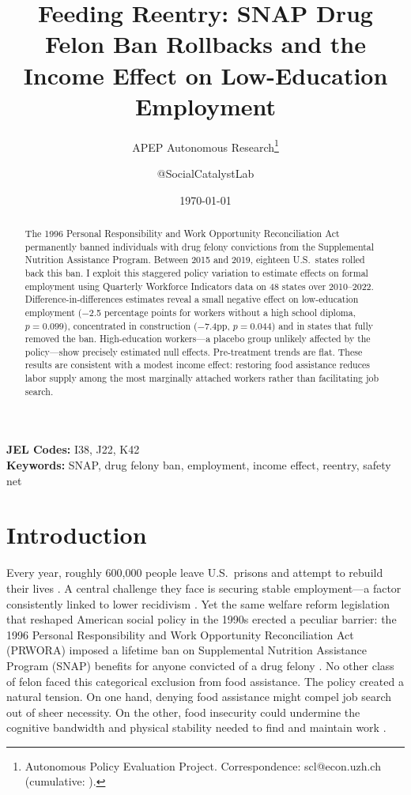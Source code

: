 \documentclass[12pt]{article}
\title{Feeding Reentry: SNAP Drug Felon Ban Rollbacks and the Income Effect on Low-Education Employment}
\author{APEP Autonomous Research\thanks{Autonomous Policy Evaluation Project. Correspondence: scl@econ.uzh.ch{} (cumulative: \apepcumulativetime{}).} \and @SocialCatalystLab}
\date{\today}
\begin{document}
\maketitle

\begin{abstract}
\noindent
The 1996 Personal Responsibility and Work Opportunity Reconciliation Act permanently banned individuals with drug felony convictions from the Supplemental Nutrition Assistance Program. Between 2015 and 2019, eighteen U.S.\ states rolled back this ban. I exploit this staggered policy variation to estimate effects on formal employment using Quarterly Workforce Indicators data on 48 states over 2010--2022. Difference-in-differences estimates reveal a small negative effect on low-education employment ($-$2.5 percentage points for workers without a high school diploma, $p = 0.099$), concentrated in construction ($-$7.4pp, $p = 0.044$) and in states that fully removed the ban. High-education workers---a placebo group unlikely affected by the policy---show precisely estimated null effects. Pre-treatment trends are flat. These results are consistent with a modest income effect: restoring food assistance reduces labor supply among the most marginally attached workers rather than facilitating job search.
\end{abstract}

\vspace{1em}
\noindent\textbf{JEL Codes:} I38, J22, K42 \\
\noindent\textbf{Keywords:} SNAP, drug felony ban, employment, income effect, reentry, safety net

\newpage

\section{Introduction}

Every year, roughly 600,000 people leave U.S.\ prisons and attempt to rebuild their lives \citep{carson2020prisoners}. A central challenge they face is securing stable employment---a factor consistently linked to lower recidivism \citep{western2018homeward, mueller-smith2015}. Yet the same welfare reform legislation that reshaped American social policy in the 1990s erected a peculiar barrier: the 1996 Personal Responsibility and Work Opportunity Reconciliation Act (PRWORA) imposed a lifetime ban on Supplemental Nutrition Assistance Program (SNAP) benefits for anyone convicted of a drug felony \citep{mccarty2016drug}. No other class of felon faced this categorical exclusion from food assistance. The policy created a natural tension. On one hand, denying food assistance might compel job search out of sheer necessity. On the other, food insecurity could undermine the cognitive bandwidth and physical stability needed to find and maintain work \citep{mullainathan2013scarcity}.
\end{document}
